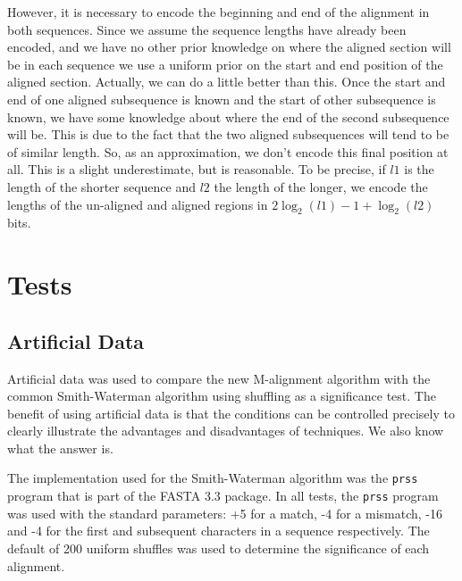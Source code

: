 \documentclass[a4paper,11pt,oneside]{article}
\begin{document}
However, it is necessary to encode the beginning and end of the alignment in
both sequences.  Since we assume the sequence lengths have already been
encoded, and we have no other prior knowledge on where the aligned section
will be in each sequence we use a uniform prior on the start and end position
of the aligned section.  Actually, we can do a little better than this.  Once
the start and end of one aligned subsequence is known and the start of other
subsequence is known, we have some knowledge about where the end of the second
subsequence will be.  This is due to the fact that the two aligned
subsequences will tend to be of similar length.  So, as an approximation, we
don't encode this final position at all.  This is a slight underestimate, but
is reasonable.  To be precise, if $l1$ is the length of the shorter sequence
and $l2$ the length of the longer, we encode the lengths of the un-aligned and
aligned regions in $2\log_2(l1) - 1 + \log_2(l2)$ bits.



\section{Tests}

\subsection{Artificial Data}

Artificial data was used to compare the new M-alignment algorithm with the
common Smith-Waterman algorithm using shuffling as a significance test.  The
benefit of using artificial data is that the conditions can be controlled
precisely to clearly illustrate the advantages and disadvantages of
techniques.
We also know what the answer is.

The implementation used for the Smith-Waterman algorithm was the \verb!prss!
program that is part of the FASTA 3.3 package.  In all tests, the \verb!prss!
program was used with the standard parameters: +5 for a match, -4 for a
mismatch, -16 and -4 for the first and subsequent characters in a sequence
respectively.  The default of 200 uniform shuffles was used to determine the
significance of each alignment.
\end{document}
